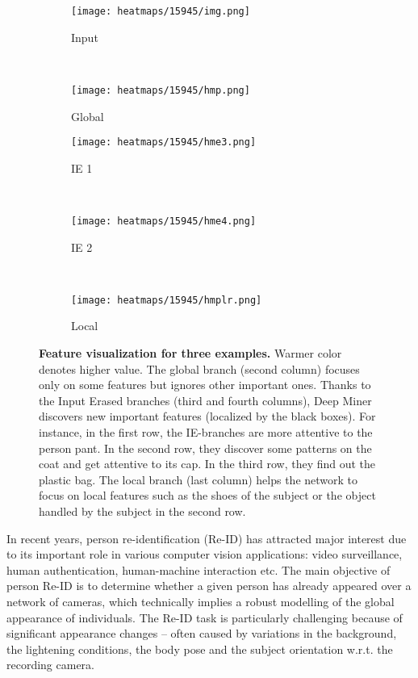 \documentclass[final]{cvpr}
\begin{document}
\begin{figure}[htbp]
    \begin{subfigure}[t]{0.15\linewidth} \centering \texttt{[image: heatmaps/15945/img.png]}
        \caption*{Input}
    \end{subfigure}
   ~
    \begin{subfigure}[t]{0.15\linewidth} \centering \texttt{[image: heatmaps/15945/hmp.png]}
        \caption*{Global}
    \end{subfigure}
    \texttildelow 
        \begin{subfigure}[t]{0.15\linewidth} \centering \texttt{[image: heatmaps/15945/hme3.png]}
        \caption*{IE 1}
    \end{subfigure}
    ~
          \begin{subfigure}[t]{0.15\linewidth} \centering \texttt{[image: heatmaps/15945/hme4.png]}
        \caption*{IE 2}
    \end{subfigure}
  ~
             \begin{subfigure}[t]{0.15\linewidth} \centering \texttt{[image: heatmaps/15945/hmplr.png]}
        \caption*{Local}
    \end{subfigure}
\caption{\textbf{Feature visualization for three examples.} Warmer color denotes higher value. The global branch (second column) focuses only on some features but ignores other important ones. Thanks to the Input Erased branches (third and fourth columns), Deep Miner discovers new important features (localized by the black boxes). For instance, in the first row, the IE-branches are more attentive to the person pant.  In the second row, they discover some patterns on the coat and get attentive to its cap. In the third row, they find out the plastic bag. The local branch (last column) helps the network to focus on local features such as the shoes of the subject or the object handled by the subject in the second row.}
\label{fig:deep_miner_viss}

\end{figure}


In recent years, person re-identification (Re-ID) has attracted major interest due to its important role in various computer vision applications: video surveillance, human authentication, human-machine interaction etc. The main objective of person Re-ID is to determine whether a given person has already appeared over a network of cameras, which technically implies a robust modelling of the global appearance of individuals. The Re-ID task is particularly challenging because of significant appearance changes -- often caused by variations in the background, the lightening conditions, the body pose and the subject orientation w.r.t. the recording camera.
\end{document}
